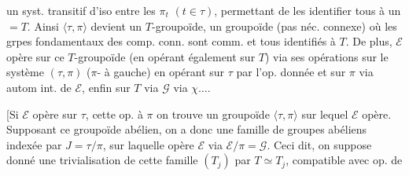 un syst. transitif d'iso entre les $\pi_t$ $(t\in\tau)$, permettant de les identifier tous à un $=T$. Ainsi $\langle\tau,\pi\rangle$ devient un $T$-groupoïde,  un groupoïde (pas néc. connexe) où les grpes fondamentaux des comp. conn. sont comm. et tous identifiés à $T$.
De plus, $\mathcal E$ opère sur ce $T$-groupoïde (en opérant également sur $T$) via ses opérations sur le système $(\tau,\pi)$ ($\pi$- à gauche) en opérant sur $\tau$ par l'op. donnée et sur $\pi$ via autom int. de $\mathcal E$, enfin sur $T$ via $\mathcal G$ via $\chi\ldots.$

[Si $\mathcal E$ opère sur $\tau$,  cette op. à $\pi$ on trouve un groupoïde $\langle\tau,\pi\rangle$ sur lequel $\mathcal E$ opère. Supposant ce groupoïde abélien, on a donc une famille de groupes abéliens  indexée par $J=\tau/\pi$, sur laquelle opère $\mathcal E$ via $\mathcal E/\pi=\mathcal G$. Ceci dit, on suppose donné une trivialisation de cette famille $(T_j)$ par $T\simeq T_j$, compatible avec op. de

